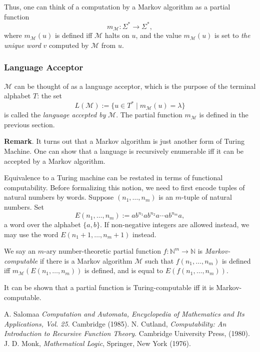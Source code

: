 \documentclass[12pt]{article}
\begin{document}
Thus, one can think of a computation by a Markov algorithm as a partial function $$m_{\mathscr{M}}:\Sigma^* \to \Sigma^*,$$ where $m_{\mathscr{M}}(u)$ is defined iff $\mathscr{M}$ halts on $u$, and the value $m_{\mathscr{M}}(u)$ is set to \emph{the unique word} $v$ computed by $\mathscr{M}$ from $u$.

\subsubsection*{Language Acceptor}

$\mathscr{M}$ can be thought of as a language acceptor, which is the purpose of the terminal alphabet $T$: the set $$L(\mathscr{M}):=\lbrace u\in T^* \mid m_{\mathscr{M}}(u)= \lambda \rbrace$$ is called the \emph{language accepted by} $\mathscr{M}$.  The partial function $m_{\mathscr{M}}$ is defined in the previous section.

\textbf{Remark}.  It turns out that a Markov algorithm is just another form of Turing Machine.  One can show that a language is recursively enumerable iff it can be accepted by a Markov algorithm.

Equivalence to a Turing machine can be restated in terms of functional computability.  Before formalizing this notion, we need to first encode tuples of natural numbers by words.  Suppose $(n_1,\ldots,n_m)$ is an $m$-tuple of natural numbers.  Set $$E(n_1,\ldots,n_m):=ab^{n_1}a b^{n_2} a\cdots ab^{n_m}a,$$ a word over the alphabet $\lbrace a,b\rbrace$.  If non-negative integers are allowed instead, we may use the word $E(n_1+1,\ldots,n_m+1)$ instead.  

We say an $m$-ary number-theoretic partial function $f:\mathbb{N}^m \to \mathbb{N}$ is \emph{Markov-computable} if there is a Markov algorithm $\mathscr{M}$ such that $f(n_1,\ldots,n_m)$ is defined iff $m_{\mathscr{M}}(E(n_1,\ldots,n_m))$ is defined, and is equal to $E(f(n_1,\ldots,n_m))$.

It can be shown that a partial function is Turing-computable iff it is Markov-computable.

\begin{thebibliography}{9}
 A. Salomaa {\em Computation and Automata, Encyclopedia of Mathematics and Its Applications, Vol. 25}. Cambridge (1985).
 N. Cutland, {\em Computability: An Introduction to Recursive Function Theory}. Cambridge University Press, (1980).
 J. D. Monk, \emph{Mathematical Logic}, Springer, New York (1976).
\end{thebibliography}
\end{document}
